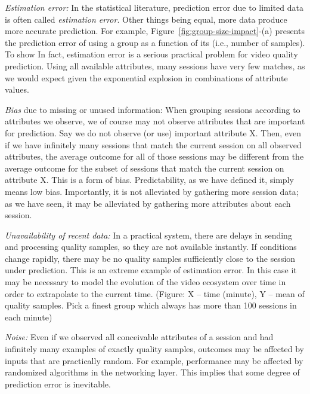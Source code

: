 \begin{packedenumerate}
  \item \emph{Estimation error:} In the statistical literature, prediction error due to limited data is often called {\it estimation error}.  Other things being equal, more data produce more accurate prediction. For example, Figure~\ref{fig:group-size-impact}-(a) presents the prediction error of using a group as a function of its (i.e., number of samples). To show  In fact, estimation error is a serious practical problem for video quality prediction.  Using all available attributes, many sessions have very few matches, as we would expect given the exponential explosion in combinations of attribute values.  
  \item \emph{Bias} due to missing or unused information: When grouping sessions according to attributes we observe, we of course may not observe attributes that are important for prediction.  Say we do not observe (or use) important attribute X.  Then, even if we have infinitely many sessions that match the current session on all observed attributes, the average outcome for all of those sessions may be different from the average outcome for the subset of sessions that match the current session on attribute X.  This is a form of bias.  Predictability, as we have defined it, simply means low bias.  Importantly, it is not alleviated by gathering more session data; as we have seen, it may be alleviated by gathering more attributes about each session.
  \item \emph{Unavailability of recent data:} In a practical system, there are delays in sending and processing quality samples, so they are not available instantly.  If conditions change rapidly, there may be no quality samples sufficiently close to the session under prediction.  This is an extreme example of estimation error.  In this case it may be necessary to model the evolution of the video ecosystem over time in order to extrapolate to the current time.
  (Figure: X -- time (minute), Y -- mean of quality samples. Pick a finest group which always has more than 100 sessions in each minute)
  \item \emph{Noise:} Even if we observed all conceivable attributes of a session and had infinitely many examples of exactly quality samples, outcomes may be affected by inputs that are practically random.  For example, performance may be affected by randomized algorithms in the networking layer.  This implies that some degree of prediction error is inevitable.
\end{packedenumerate}

